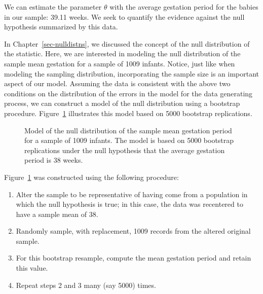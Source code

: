 \documentclass[
  letterpaper,
  DIV=11,
  numbers=noendperiod]{scrreprt}
\providecommand{\tightlist}{%
  \setlength{\itemsep}{0pt}\setlength{\parskip}{0pt}}\usepackage{longtable,booktabs,array}
\theoremstyle{definition}
\theoremstyle{definition}
\theoremstyle{plain}
\theoremstyle{remark}
\begin{document}
We can estimate the parameter \(\theta\) with the average gestation
period for the babies in our sample: 39.11 weeks. We seek to quantify
the evidence against the null hypothesis summarized by this data.

In Chapter~\ref{sec-nulldistns}, we discussed the concept of the null
distribution of the statistic. Here, we are interested in modeling the
null distribution of the sample mean gestation for a sample of 1009
infants. Notice, just like when modeling the sampling distribution,
incorporating the sample size is an important aspect of our model.
Assuming the data is consistent with the above two conditions on the
distribution of the errors in the model for the data generating process,
we can construct a model of the null distribution using a bootstrap
procedure. Figure~\ref{fig-teststat-null-mean} illustrates this model
based on 5000 bootstrap replications.

\begin{figure}


\caption{\label{fig-teststat-null-mean}Model of the null distribution of
the sample mean gestation period for a sample of 1009 infants. The model
is based on 5000 bootstrap replications under the null hypothesis that
the average gestation period is 38 weeks.}

\end{figure}%

Figure~\ref{fig-teststat-null-mean} was constructed using the following
procedure:

\begin{enumerate}
\def\labelenumi{\arabic{enumi}.}
\tightlist
\item
  Alter the sample to be representative of having come from a population
  in which the null hypothesis is true; in this case, the data was
  recentered to have a sample mean of 38.
\item
  Randomly sample, with replacement, 1009 records from the altered
  original sample.
\item
  For this bootstrap resample, compute the mean gestation period and
  retain this value.
\item
  Repeat steps 2 and 3 many (say 5000) times.
\end{enumerate}
\end{document}
